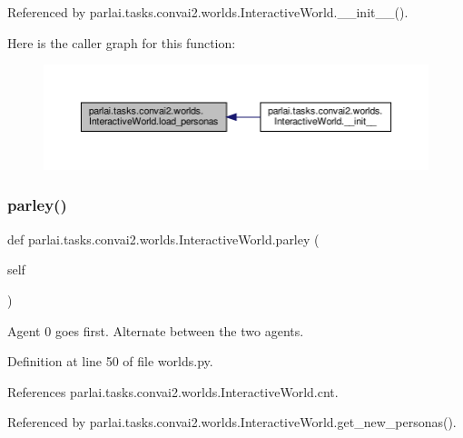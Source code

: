 Referenced by parlai.\+tasks.\+convai2.\+worlds.\+Interactive\+World.\+\_\+\+\_\+init\+\_\+\+\_\+().

Here is the caller graph for this function\+:
\nopagebreak
\begin{figure}[H]
\begin{center}
\leavevmode
\includegraphics[width=350pt]{classparlai_1_1tasks_1_1convai2_1_1worlds_1_1InteractiveWorld_aaf7775da8f8df0657d836225f3217a55_icgraph}
\end{center}
\end{figure}
\mbox{\label{classparlai_1_1tasks_1_1convai2_1_1worlds_1_1InteractiveWorld_a75559c133b900cdd71389c9760e9a703}} 
\subsubsection{\texorpdfstring{parley()}{parley()}}
{\footnotesize\ttfamily def parlai.\+tasks.\+convai2.\+worlds.\+Interactive\+World.\+parley (\begin{DoxyParamCaption}\item[{}]{self }\end{DoxyParamCaption})}

\begin{DoxyVerb}Agent 0 goes first. Alternate between the two agents.\end{DoxyVerb}
 

Definition at line 50 of file worlds.\+py.



References parlai.\+tasks.\+convai2.\+worlds.\+Interactive\+World.\+cnt.



Referenced by parlai.\+tasks.\+convai2.\+worlds.\+Interactive\+World.\+get\+\_\+new\+\_\+personas().

